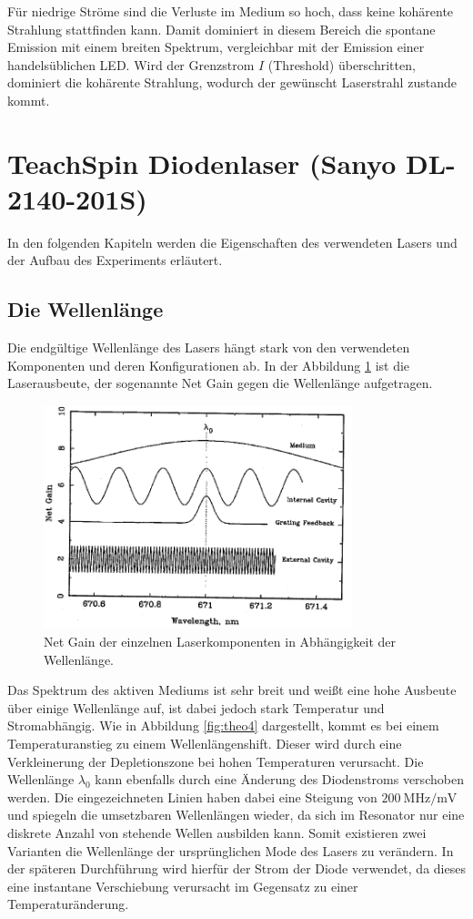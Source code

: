 Für niedrige Ströme sind die Verluste im Medium so hoch, dass keine kohärente Strahlung stattfinden kann. Damit dominiert in diesem Bereich die spontane Emission mit einem breiten Spektrum, vergleichbar mit der Emission einer handelsüblichen LED. Wird der Grenzstrom $I$ (Threshold) überschritten, dominiert die kohärente Strahlung, wodurch der gewünscht Laserstrahl zustande kommt.

\section{TeachSpin Diodenlaser (Sanyo DL-2140-201S)} 

In den folgenden Kapiteln werden die Eigenschaften des verwendeten Lasers und der Aufbau des Experiments erläutert.

\subsection{Die Wellenlänge}
Die endgültige Wellenlänge des Lasers hängt stark von den verwendeten Komponenten und deren Konfigurationen ab. In der Abbildung \ref{theo3} ist die Laserausbeute, der sogenannte Net Gain gegen die Wellenlänge aufgetragen.

\begin{figure}[H]
\centering
\includegraphics[width=0.8\textwidth]{ressources/net_gain.png}
\caption{Net Gain der einzelnen Laserkomponenten in Abhängigkeit der Wellenlänge. \cite{skript}}
\label{theo3}
\end{figure}

Das Spektrum des aktiven Mediums ist sehr breit und weißt eine hohe Ausbeute über einige Wellenlänge auf, ist dabei jedoch stark Temperatur und Stromabhängig. Wie in Abbildung \ref{fig:theo4} dargestellt, kommt es bei einem Temperaturanstieg zu einem Wellenlängenshift. Dieser wird durch eine Verkleinerung der Depletionszone bei hohen Temperaturen verursacht. Die Wellenlänge $\lambda_0$ kann ebenfalls durch eine Änderung des Diodenstroms verschoben werden. Die eingezeichneten Linien haben dabei eine Steigung von $\SI{200}{\mega\hertz\per\milli\volt}$ und spiegeln die umsetzbaren Wellenlängen wieder, da sich im Resonator nur eine diskrete Anzahl von stehende Wellen ausbilden kann. Somit existieren zwei Varianten die Wellenlänge der ursprünglichen Mode des Lasers zu verändern. In der späteren Durchführung wird hierfür der Strom der Diode verwendet, da dieses eine instantane Verschiebung verursacht im Gegensatz zu einer Temperaturänderung.

